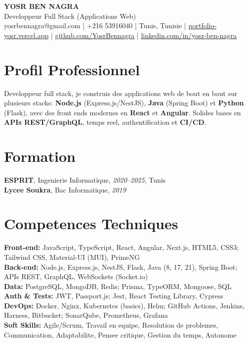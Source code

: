 \documentclass[10pt,a4paper]{article}
\begin{document}
\begin{center}
  {\Large\bfseries YOSR BEN NAGRA}\\[2pt]
  {\small Developpeur Full Stack (Applications Web)}\\[3pt]
  {\footnotesize yosrbennagra@gmail.com \;|\; +216 53916040 \;|\; Tunis, Tunisie \;|\; \href{https://portfolio-yosr.vercel.app/en}{portfolio-yosr.vercel.app} \;|\; \href{https://github.com/YosrBennagra}{github.com/YosrBennagra} \;|\; \href{https://www.linkedin.com/in/yosr-ben-nagra/}{linkedin.com/in/yosr-ben-nagra}}
\end{center}

\section*{Profil Professionnel}
{\small
Developpeur full stack, je construis des applications web de bout en bout sur plusieurs stacks: \textbf{Node.js} (Express.js/NestJS), \textbf{Java} (Spring Boot) et \textbf{Python} (Flask), avec des front ends modernes en \textbf{React} et \textbf{Angular}. Solides bases en \textbf{APIs REST/GraphQL}, temps reel, authentification et \textbf{CI/CD}.
}

\vspace{4pt}

\section*{Formation}
{\small
\textbf{ESPRIT}, Ingenierie Informatique, \textit{2020--2025}, Tunis\\[1pt]
\textbf{Lycee Soukra}, Bac Informatique, \textit{2019}
}

\vspace{4pt}

\section*{Competences Techniques}
{\small
\textbf{Front-end:} JavaScript, TypeScript, React, Angular, Next.js, HTML5, CSS3; Tailwind CSS, Material-UI (MUI), PrimeNG\\[2pt]
\textbf{Back-end:} Node.js, Express.js, NestJS, Flask, Java (8, 17, 21), Spring Boot; APIs REST, GraphQL, WebSockets (Socket.io)\\[2pt]
\textbf{Data:} PostgreSQL, MongoDB, Redis; Prisma, TypeORM, Mongoose, SQL\\[2pt]
\textbf{Auth \& Tests:} JWT, Passport.js; Jest, React Testing Library, Cypress\\[2pt]
\textbf{DevOps:} Docker, Nginx, Kubernetes (basics), Helm; GitHub Actions, Jenkins, Harness, Bitbucket; SonarQube, Prometheus, Grafana\\[2pt]
\textbf{Soft Skills:} Agile/Scrum, Travail en equipe, Resolution de problemes, Communication, Adaptabilite, Pensee critique, Gestion du temps, Autonome
}
\end{document}
